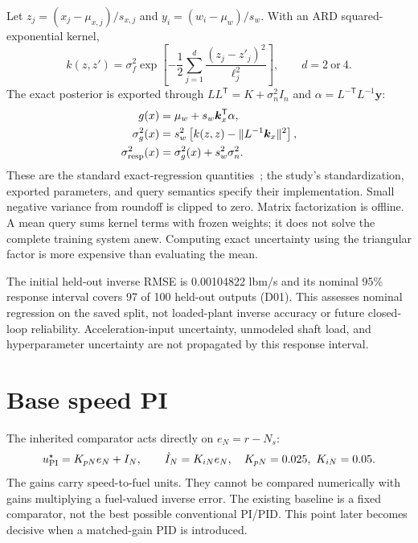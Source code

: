 Let $z_j=(x_j-\mu_{x,j})/s_{x,j}$ and $y_i=(w_i-\mu_w)/s_w$. With an ARD squared-exponential kernel,
\begin{equation}
k(z,z')=\sigma_f^2\exp\!\left[-\frac12\sum_{j=1}^{d}\frac{(z_j-z'_j)^2}{\ell_j^2}\right],\qquad d=2\ \text{or}\ 4.
\end{equation}
The exact posterior is exported through $LL^\mathsf T=K+\sigma_n^2I_n$ and $\alpha=L^{-\mathsf T}L^{-1}\bm y$:
\begin{align}
g(x)&=\mu_w+s_w\bm k_x^\mathsf T\alpha,\\
\sigma_g^2(x)&=s_w^2\left[k(z,z)-\|L^{-1}\bm k_x\|^2\right],\\
\sigma_{\rm resp}^2(x)&=\sigma_g^2(x)+s_w^2\sigma_n^2.
\label{eq:gpvariance}
\end{align}
These are the standard exact-regression quantities~\cite{gpml}; the study's standardization, exported parameters, and query semantics specify their implementation. Small negative variance from roundoff is clipped to zero. Matrix factorization is offline. A mean query sums kernel terms with frozen weights; it does not solve the complete training system anew. Computing exact uncertainty using the triangular factor is more expensive than evaluating the mean.

The initial held-out inverse RMSE is 0.00104822 lbm/s and its nominal 95\% response interval covers 97 of 100 held-out outputs (D01). This assesses nominal regression on the saved split, not loaded-plant inverse accuracy or future closed-loop reliability. Acceleration-input uncertainty, unmodeled shaft load, and hyperparameter uncertainty are not propagated by this response interval.

\section{Base speed PI}
The inherited comparator acts directly on $e_N=r-N_s$:
\begin{equation}
u_{\rm PI}^\star=K_{pN}e_N+I_N,\qquad \dot I_N=K_{iN}e_N,
\quad K_{pN}=0.025,\ K_{iN}=0.05.
\end{equation}
The gains carry speed-to-fuel units. They cannot be compared numerically with gains multiplying a fuel-valued inverse error. The existing baseline is a fixed comparator, not the best possible conventional PI/PID. This point later becomes decisive when a matched-gain PID is introduced.

